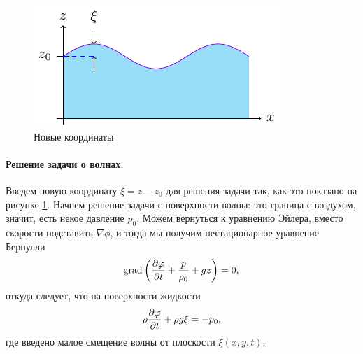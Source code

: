 \begin{figure}[H]
    \centering
    \includegraphics[scale=1.5]{img/simple_wave2}
    \caption{Новые координаты}
    \label{fig:simplewave2}
\end{figure}

\paragraph{Решение задачи о волнах.} Введем новую координату $\xi=z-z_0$  для решения задачи так, как это показано на рисунке \ref{fig:simplewave2}. Начнем решение задачи с поверхности волны: это граница с воздухом, значит, есть некое давление $p_0$. Можем вернуться к уравнению Эйлера, вместо скорости подставить $\nabla\phi$, и тогда мы получим нестационарное уравнение Бернулли
\begin{equation}
	\operatorname{grad}\qty(\pdv{\varphi}{t}+\frac{p}{\rho_0}+gz)=0,
\end{equation}
откуда следует, что на поверхности жидкости
\begin{equation}
	\rho\pdv{\varphi}{t}+\rho g\xi=-p_0,
\end{equation}
где введено малое смещение волны от плоскости $\xi(x,y,t)$.

